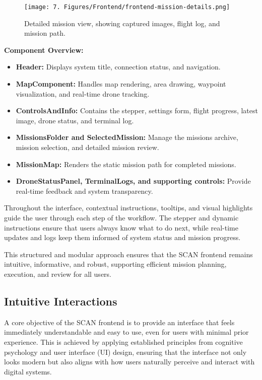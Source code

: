 \begin{figure}[H]
    \centering
    \texttt{[image: 7. Figures/Frontend/frontend-mission-details.png]}
    \caption{Detailed mission view, showing captured images, flight log, and mission path.}
    \label{fig:frontend-mission-details}
\end{figure}

\textbf{Component Overview:}
\begin{itemize}
    \item \textbf{Header:} Displays system title, connection status, and navigation.
    \item \textbf{MapComponent:} Handles map rendering, area drawing, waypoint visualization, and real-time drone tracking.
    \item \textbf{ControlsAndInfo:} Contains the stepper, settings form, flight progress, latest image, drone status, and terminal log.
    \item \textbf{MissionsFolder and SelectedMission:} Manage the missions archive, mission selection, and detailed mission review.
    \item \textbf{MissionMap:} Renders the static mission path for completed missions.
    \item \textbf{DroneStatusPanel, TerminalLogs, and supporting controls:} Provide real-time feedback and system transparency.
\end{itemize}

Throughout the interface, contextual instructions, tooltips, and visual highlights guide the user through each step of the workflow. The stepper and dynamic instructions ensure that users always know what to do next, while real-time updates and logs keep them informed of system status and mission progress.

This structured and modular approach ensures that the SCAN frontend remains intuitive, informative, and robust, supporting efficient mission planning, execution, and review for all users.

\subsection{Intuitive Interactions}
\label{sec:intuitive-interactions}
A core objective of the SCAN frontend is to provide an interface that feels immediately understandable and easy to use, even for users with minimal prior experience. 
This is achieved by applying established principles from cognitive psychology and user interface (UI) design, ensuring that the interface not only looks modern but also aligns with how users naturally perceive and interact with digital systems.

